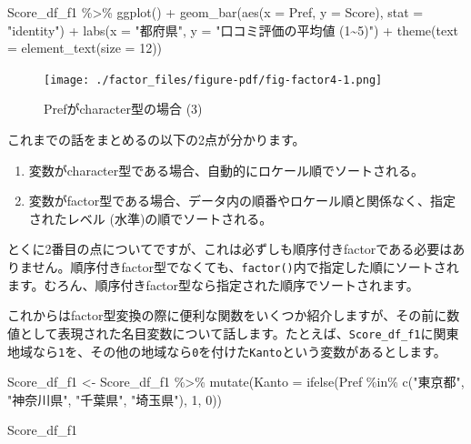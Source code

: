 \documentclass[
  a4paper,
  pandoc,
  ja=standard,
  jafont=haranoaji]{bxjsbook}
\newenvironment{Shaded}{\begin{snugshade}}{\end{snugshade}}
\newcommand{\AttributeTok}[1]{\textcolor[rgb]{0.00,0.48,0.65}{#1}}
\newcommand{\DecValTok}[1]{\textcolor[rgb]{0.68,0.00,0.00}{#1}}
\newcommand{\FunctionTok}[1]{\textcolor[rgb]{0.28,0.35,0.67}{#1}}
\newcommand{\NormalTok}[1]{\textcolor[rgb]{0.00,0.48,0.65}{#1}}
\newcommand{\OtherTok}[1]{\textcolor[rgb]{0.00,0.48,0.65}{#1}}
\newcommand{\SpecialCharTok}[1]{\textcolor[rgb]{0.37,0.37,0.37}{#1}}
\newcommand{\StringTok}[1]{\textcolor[rgb]{0.13,0.47,0.30}{#1}}
\providecommand{\tightlist}{%
  \setlength{\itemsep}{0pt}\setlength{\parskip}{0pt}}
\begin{document}
\begin{Shaded}
\begin{Highlighting}[numbers=left,,]
\NormalTok{Score\_df\_f1 }\SpecialCharTok{\%\textgreater{}\%}
  \FunctionTok{ggplot}\NormalTok{() }\SpecialCharTok{+}
  \FunctionTok{geom\_bar}\NormalTok{(}\FunctionTok{aes}\NormalTok{(}\AttributeTok{x =}\NormalTok{ Pref, }\AttributeTok{y =}\NormalTok{ Score), }\AttributeTok{stat =} \StringTok{"identity"}\NormalTok{) }\SpecialCharTok{+}
  \FunctionTok{labs}\NormalTok{(}\AttributeTok{x =} \StringTok{"都府県"}\NormalTok{, }\AttributeTok{y =} \StringTok{"口コミ評価の平均値 (1\textasciitilde{}5)"}\NormalTok{) }\SpecialCharTok{+}
  \FunctionTok{theme}\NormalTok{(}\AttributeTok{text =} \FunctionTok{element\_text}\NormalTok{(}\AttributeTok{size =} \DecValTok{12}\NormalTok{))}
\end{Highlighting}
\end{Shaded}

\begin{figure}[H]

{\centering \texttt{[image: ./factor\_files/figure-pdf/fig-factor4-1.png]}

}

\caption{\label{fig-factor4}Prefがcharacter型の場合 (3)}

\end{figure}

これまでの話をまとめるの以下の2点が分かります。

\begin{enumerate}
\def\labelenumi{\arabic{enumi}.}
\tightlist
\item
  変数がcharacter型である場合、自動的にロケール順でソートされる。
\item
  変数がfactor型である場合、データ内の順番やロケール順と関係なく、指定されたレベル
  (水準)の順でソートされる。
\end{enumerate}

とくに2番目の点についてですが、これは必ずしも順序付きfactorである必要はありません。順序付きfactor型でなくても、\texttt{factor()}内で指定した順にソートされます。むろん、順序付きfactor型なら指定された順序でソートされます。

これからはfactor型変換の際に便利な関数をいくつか紹介しますが、その前に数値として表現された名目変数について話します。たとえば、\texttt{Score\_df\_f1}に関東地域なら\texttt{1}を、その他の地域なら\texttt{0}を付けた\texttt{Kanto}という変数があるとします。

\begin{Shaded}
\begin{Highlighting}[numbers=left,,]
\NormalTok{Score\_df\_f1 }\OtherTok{\textless{}{-}}\NormalTok{ Score\_df\_f1 }\SpecialCharTok{\%\textgreater{}\%}
  \FunctionTok{mutate}\NormalTok{(}\AttributeTok{Kanto =} \FunctionTok{ifelse}\NormalTok{(Pref }\SpecialCharTok{\%in\%} \FunctionTok{c}\NormalTok{(}\StringTok{"東京都"}\NormalTok{, }\StringTok{"神奈川県"}\NormalTok{, }\StringTok{"千葉県"}\NormalTok{, }\StringTok{"埼玉県"}\NormalTok{), }\DecValTok{1}\NormalTok{, }\DecValTok{0}\NormalTok{))}

\NormalTok{Score\_df\_f1}
\end{Highlighting}
\end{Shaded}
\end{document}
